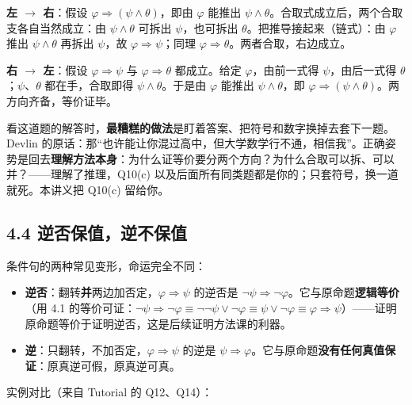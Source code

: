 \documentclass[UTF8,a4paper,11pt]{ctexart}
\begin{document}
\textbf{左 $\rightarrow$ 右}：假设 $\varphi \Rightarrow (\psi \land \theta)$，即由 $\varphi$ 能推出 $\psi \land \theta$。合取式成立后，两个合取支各自当然成立：由 $\psi \land \theta$ 可拆出 $\psi$，也可拆出 $\theta$。把推导接起来（链式）：由 $\varphi$ 推出 $\psi \land \theta$ 再拆出 $\psi$，故 $\varphi \Rightarrow \psi$；同理 $\varphi \Rightarrow \theta$。两者合取，右边成立。

\textbf{右 $\rightarrow$ 左}：假设 $\varphi \Rightarrow \psi$ 与 $\varphi \Rightarrow \theta$ 都成立。给定 $\varphi$，由前一式得 $\psi$，由后一式得 $\theta$；$\psi$、$\theta$ 都在手，合取即得 $\psi \land \theta$。于是由 $\varphi$ 能推出 $\psi \land \theta$，即 $\varphi \Rightarrow (\psi \land \theta)$。两方向齐备，等价证毕。

\begin{calcbox}
看这道题的解答时，\textbf{最糟糕的做法}是盯着答案、把符号和数字换掉去套下一题。Devlin 的原话：那“也许能让你混过高中，但大学数学行不通，相信我”。正确姿势是回去\textbf{理解方法本身}：为什么证等价要分两个方向？为什么合取可以拆、可以并？——理解了推理，Q10(c) 以及后面所有同类题都是你的；只套符号，换一道就死。本讲义把 Q10(c) 留给你。
\end{calcbox}

\subsection*{4.4 逆否保值，逆不保值}

条件句的两种常见变形，命运完全不同：

\begin{keyconcept}
\begin{itemize}
  \item \textbf{逆否}：翻转\textbf{并}两边加否定，$\varphi \Rightarrow \psi$ 的逆否是 $\neg \psi \Rightarrow \neg \varphi$。它与原命题\textbf{逻辑等价}（用 4.1 的等价可证：$\neg\psi \Rightarrow \neg\varphi \equiv \neg\neg\psi \lor \neg\varphi \equiv \psi \lor \neg\varphi \equiv \varphi \Rightarrow \psi$）——证明原命题等价于证明逆否，这是后续证明方法课的利器。
  \item \textbf{逆}：只翻转，不加否定，$\varphi \Rightarrow \psi$ 的逆是 $\psi \Rightarrow \varphi$。它与原命题\textbf{没有任何真值保证}：原真逆可假，原真逆可真。
\end{itemize}
\end{keyconcept}

实例对比（来自 Tutorial 的 Q12、Q14）：
\end{document}
